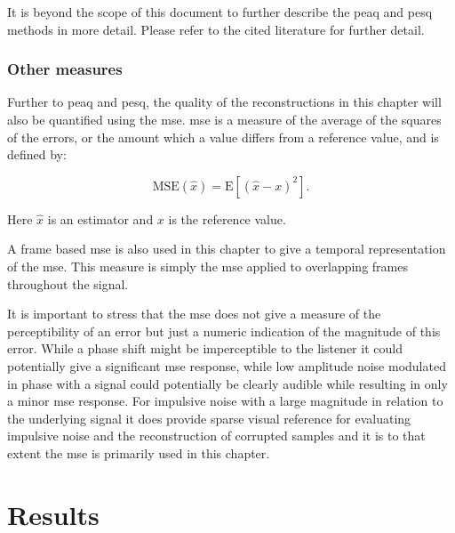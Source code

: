 It is beyond the scope of this document to further describe the \gls{peaq} and \gls{pesq} methods in more detail. Please refer to the cited literature for further detail.

\subsubsection{Other measures}
Further to \gls{peaq} and \gls{pesq}, the quality of the reconstructions in this chapter will also be quantified using the \gls{mse}. \gls{mse} is a measure of the average of the squares of the errors, or the amount which a value differs from a reference value, and is defined by:

\begin{equation}\label{eq:MSEdef}
\textrm{MSE}\left(\hat{x}\right) = \textrm{E} \left[ \left( \hat{x} - x \right)^2\right].
\end{equation}

Here $\hat{x}$ is an estimator and $x$ is the reference value.

A frame based \gls{mse} is also used in this chapter to give a temporal representation of the \gls{mse}. This measure is simply the \gls{mse} applied to overlapping frames throughout the signal.

It is important to stress that the \gls{mse} does not give a measure of the perceptibility of an error but just a numeric indication of the magnitude of this error. While a phase shift might be imperceptible to the listener it could potentially give a significant \gls{mse} response, while low amplitude noise modulated in phase with a signal could potentially be clearly audible while resulting in only a minor \gls{mse} response. For impulsive noise with a large magnitude in relation to the underlying signal it does provide sparse visual reference for evaluating impulsive noise and the reconstruction of corrupted samples and it is to that extent the \gls{mse} is primarily used in this chapter.

%


\section{Results}\label{sec:RestorationResults}
